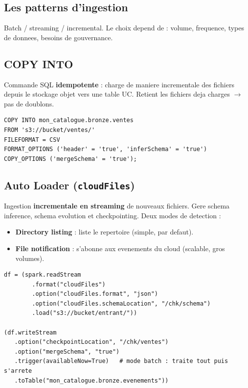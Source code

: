 \documentclass[11pt,a4paper]{article}
\begin{document}
\subsection{Les patterns d'ingestion}

Batch / streaming / incremental. Le choix depend de : volume, frequence, types de donnees,
besoins de gouvernance.

\subsection{COPY INTO}

Commande SQL \textbf{idempotente} : charge de maniere incrementale des fichiers depuis le
stockage objet vers une table UC. Retient les fichiers deja charges $\rightarrow$ pas de doublons.

\begin{lstlisting}[style=sqlstyle,caption={COPY INTO depuis le stockage objet}]
COPY INTO mon_catalogue.bronze.ventes
FROM 's3://bucket/ventes/'
FILEFORMAT = CSV
FORMAT_OPTIONS ('header' = 'true', 'inferSchema' = 'true')
COPY_OPTIONS ('mergeSchema' = 'true');
\end{lstlisting}

\subsection{Auto Loader (\texttt{cloudFiles})}

Ingestion \textbf{incrementale en streaming} de nouveaux fichiers. Gere schema inference,
schema evolution et checkpointing. Deux modes de detection :
\begin{itemize}[leftmargin=*,nosep]
  \item \textbf{Directory listing} : liste le repertoire (simple, par defaut).
  \item \textbf{File notification} : s'abonne aux evenements du cloud (scalable, gros volumes).
\end{itemize}

\begin{lstlisting}[style=pystyle,caption={Auto Loader avec evolution de schema}]
df = (spark.readStream
        .format("cloudFiles")
        .option("cloudFiles.format", "json")
        .option("cloudFiles.schemaLocation", "/chk/schema")
        .load("s3://bucket/entrant/"))

(df.writeStream
   .option("checkpointLocation", "/chk/ventes")
   .option("mergeSchema", "true")
   .trigger(availableNow=True)   # mode batch : traite tout puis s'arrete
   .toTable("mon_catalogue.bronze.evenements"))
\end{lstlisting}
\end{document}
